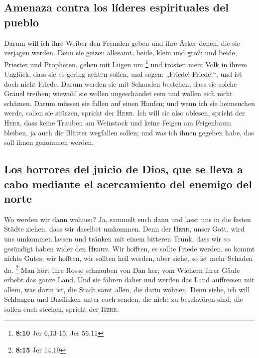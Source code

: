 \hypertarget{amenaza-contra-los-luxedderes-espirituales-del-pueblo}{%
\subsection{Amenaza contra los líderes espirituales del
pueblo}\label{amenaza-contra-los-luxedderes-espirituales-del-pueblo}}

 Darum will ich ihre Weiber den Fremden geben und ihre
Äcker denen, die sie verjagen werden. Denn sie geizen allesamt, beide,
klein und groß; und beide, Priester und Propheten, gehen mit Lügen um
\footnote{\textbf{8:10} Jer 6,13-15; Jes 56,11}  und
trösten mein Volk in ihrem Unglück, dass sie es gering achten sollen,
und sagen: „Friede! Friede!{}``, und ist doch nicht Friede.
 Darum werden sie mit Schanden bestehen, dass sie solche
Gräuel treiben; wiewohl sie wollen ungeschändet sein und wollen sich
nicht schämen. Darum müssen sie fallen auf einen Haufen; und wenn ich
sie heimsuchen werde, sollen sie stürzen, spricht der \textsc{Herr}.
 Ich will sie also ablesen, spricht der \textsc{Herr},
dass keine Trauben am Weinstock und keine Feigen am Feigenbaum bleiben,
ja auch die Blätter wegfallen sollen; und was ich ihnen gegeben habe,
das soll ihnen genommen werden.

\hypertarget{los-horrores-del-juicio-de-dios-que-se-lleva-a-cabo-mediante-el-acercamiento-del-enemigo-del-norte}{%
\subsection{Los horrores del juicio de Dios, que se lleva a cabo
mediante el acercamiento del enemigo del
norte}\label{los-horrores-del-juicio-de-dios-que-se-lleva-a-cabo-mediante-el-acercamiento-del-enemigo-del-norte}}

 Wo werden wir dann wohnen? Ja, sammelt euch dann und
lasst uns in die festen Städte ziehen, dass wir daselbst umkommen. Denn
der \textsc{Herr}, unser Gott, wird uns umkommen lassen und tränken mit
einem bitteren Trunk, dass wir so gesündigt haben wider den
\textsc{Herrn}.  Wir hofften, es sollte Friede werden, so
kommt nichts Gutes; wir hofften, wir sollten heil werden, aber siehe, so
ist mehr Schaden da. \footnote{\textbf{8:15} Jer 14,19} 
Man hört ihre Rosse schnauben von Dan her; vom Wiehern ihrer Gäule
erbebt das ganze Land. Und sie fahren daher und werden das Land
auffressen mit allem, was darin ist, die Stadt samt allen, die darin
wohnen.  Denn siehe, ich will Schlangen und Basilisken
unter euch senden, die nicht zu beschwören sind; die sollen euch
stechen, spricht der \textsc{Herr}.

